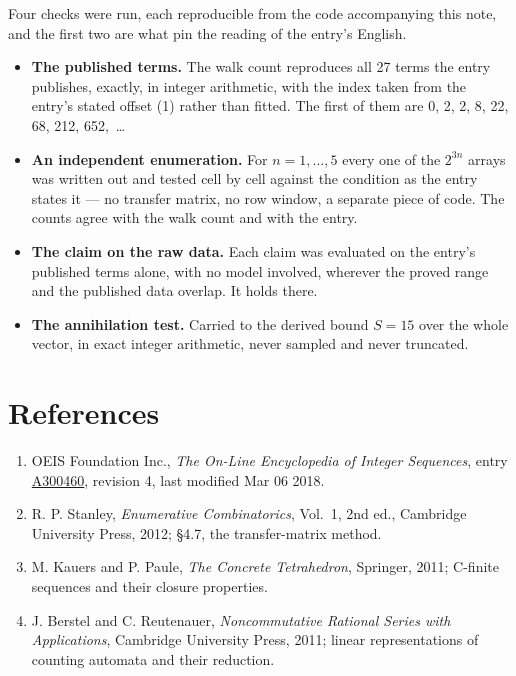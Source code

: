 \documentclass[11pt]{article}
\theoremstyle{definition}
\begin{document}
Four checks were run, each reproducible from the code accompanying this note, and the first two are what pin the reading of the entry's English.

\begin{itemize}

\item {\bfseries The published terms.} The walk count reproduces all 27 terms the entry publishes, exactly, in integer arithmetic, with the index taken from the entry's stated offset (1) rather than fitted. The first of them are 0, 2, 2, 8, 22, 68, 212, 652,~\dots

\item {\bfseries An independent enumeration.} For $n = 1,\dots,5$ every one of the $2^{3n}$ arrays was written out and tested cell by cell against the condition as the entry states it --- no transfer matrix, no row window, a separate piece of code. The counts agree with the walk count and with the entry.

\item {\bfseries The claim on the raw data.} Each claim was evaluated on the entry's published terms alone, with no model involved, wherever the proved range and the published data overlap. It holds there.

\item {\bfseries The annihilation test.} Carried to the derived bound $S = 15$ over the whole vector, in exact integer arithmetic, never sampled and never truncated.

\end{itemize}

\section{References}

\begin{enumerate}

\item OEIS Foundation Inc., \emph{The On-Line Encyclopedia of Integer Sequences}, entry \href{https://oeis.org/A300460}{A300460}, revision 4, last modified Mar 06 2018.

\item R. P. Stanley, \emph{Enumerative Combinatorics}, Vol.~1, 2nd ed., Cambridge University Press, 2012; \S4.7, the transfer-matrix method.

\item M. Kauers and P. Paule, \emph{The Concrete Tetrahedron}, Springer, 2011; C-finite sequences and their closure properties.

\item J. Berstel and C. Reutenauer, \emph{Noncommutative Rational Series with Applications}, Cambridge University Press, 2011; linear representations of counting automata and their reduction.

\end{enumerate}
\end{document}
